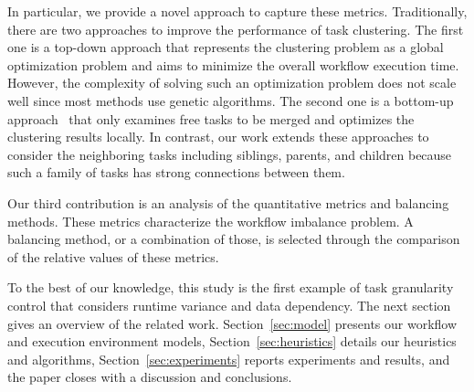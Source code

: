 In particular, we provide a novel approach to capture these metrics. Traditionally, there are two approaches to improve the performance of task clustering. The first one is a top-down approach \cite{6217508} that represents the clustering problem as a global optimization problem and aims to minimize the overall workflow execution time. However, the complexity of solving such an optimization problem does not scale well since most methods use genetic algorithms. The second one is a bottom-up approach~\cite{Muthuvelu:2005:DJG:1082290.1082297,4958835} that only examines free tasks to be merged and optimizes the clustering results locally. In contrast, our work extends these approaches to consider the neighboring tasks including siblings, parents, and children because such a family of tasks has strong connections between them. 

Our third contribution is an analysis of the quantitative metrics and balancing methods. These metrics characterize the workflow imbalance problem. A balancing method, or a combination of those, is selected through the comparison of the relative values of these metrics.


%

To the best of our knowledge, this study is the first example of task granularity control that considers runtime variance and data dependency. The next section gives an overview of the related work. Section~\ref{sec:model} presents our workflow and execution environment models, Section~\ref{sec:heuristics} details our heuristics and algorithms, Section~\ref{sec:experiments} reports experiments and results, and the paper closes with a discussion and conclusions.


